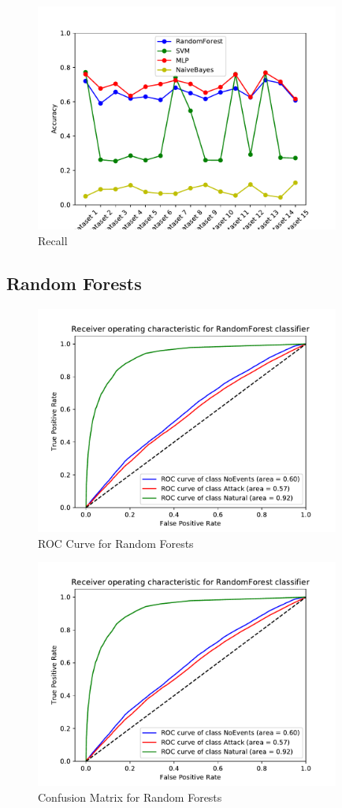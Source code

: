 \begin{figure}[H]
    \centering
    \includegraphics[page=4, width=100mm]{images/results_scikit.pdf}
    \caption{Recall}
    \label{fig_scikit_recall}
\end{figure}

\subsection{Random Forests}

\begin{figure}[H]
    \centering
    \includegraphics[page=1, width=100mm]{images/results_scikit/RandomForest}
    \caption{ROC Curve for Random Forests}
    \label{fig_scikit_RF_ROC}
\end{figure}

\begin{figure}[H]
    \centering
    \includegraphics[page=2, width=100mm, trim= 0 50 0 100, clip]{images/results_scikit/RandomForest}
    \caption{Confusion Matrix for Random Forests}
    \label{fig_scikit_CM_ROC}
\end{figure}


